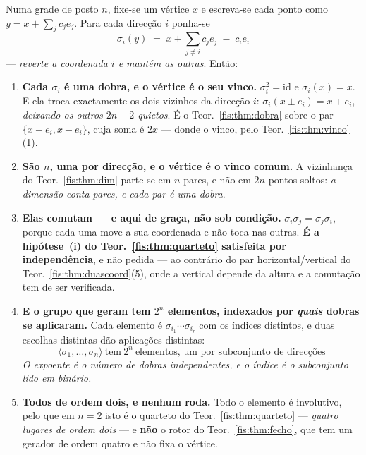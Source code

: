 \documentclass[livro.tex]{subfiles}
\begin{document}
\begin{teorema}\label{fis:thm:vizdobra}
Numa grade de posto $n$, fixe-se um vértice $x$ e escreva-se cada ponto como
$y=x+\sum_j c_j e_j$. Para cada direcção $i$ ponha-se
\[
\boxed{\;\sigma_i(y)\;=\;x+\sum_{j\neq i}c_j e_j\;-\;c_i e_i\;}
\]
--- \emph{reverte a coordenada $i$ e mantém as outras}. Então:
\begin{enumerate}\itemsep3pt
\item[(1)] \textbf{Cada $\sigma_i$ é uma dobra, e o vértice é o seu vinco.}
$\sigma_i^{2}=\mathrm{id}$ e $\sigma_i(x)=x$. E ela troca exactamente os dois
vizinhos da direcção $i$: $\sigma_i(x\pm e_i)=x\mp e_i$, \emph{deixando os outros
$2n-2$ quietos}. É o Teor.~\ref{fis:thm:dobra} sobre o par $\{x+e_i,x-e_i\}$,
cuja soma é $2x$ --- donde o vinco, pelo Teor.~\ref{fis:thm:vinco}(1).
\item[(2)] \textbf{São $n$, uma por direcção, e o vértice é o vinco comum.} A
vizinhança do Teor.~\ref{fis:thm:dim} parte-se em $n$ pares, e não em $2n$
pontos soltos: \emph{a dimensão conta pares, e cada par é uma dobra}.
\item[(3)] \textbf{Elas comutam --- e aqui de graça, não sob condição.}
$\sigma_i\sigma_j=\sigma_j\sigma_i$, porque cada uma move a sua coordenada e não
toca nas outras. \textbf{É a hipótese~(i) do Teor.~\ref{fis:thm:quarteto}
satisfeita por independência}, e não pedida --- ao contrário do par
horizontal/vertical do Teor.~\ref{fis:thm:duascoord}(5), onde a vertical depende
da altura e a comutação tem de ser verificada.
\item[(4)] \textbf{E o grupo que geram tem $2^{n}$ elementos, indexados por
\emph{quais} dobras se aplicaram.} Cada elemento é
$\sigma_{i_1}\cdots\sigma_{i_r}$ com os índices distintos, e duas escolhas
distintas dão aplicações distintas:
\[
\boxed{\;\langle\sigma_1,\dots,\sigma_n\rangle\ \text{tem}\ 2^{n}\ \text{elementos, um por subconjunto de direcções}\;}
\]
\emph{O expoente é o número de dobras independentes, e o índice é o subconjunto
lido em binário.}
\item[(5)] \textbf{Todos de ordem dois, e nenhum roda.} Todo o elemento é
involutivo, pelo que em $n=2$ isto é o quarteto do
Teor.~\ref{fis:thm:quarteto} --- \emph{quatro lugares de ordem dois} --- e
\textbf{não} o rotor do Teor.~\ref{fis:thm:fecho}, que tem um gerador de ordem
quatro e não fixa o vértice.
\end{enumerate}
\end{teorema}
\end{document}
